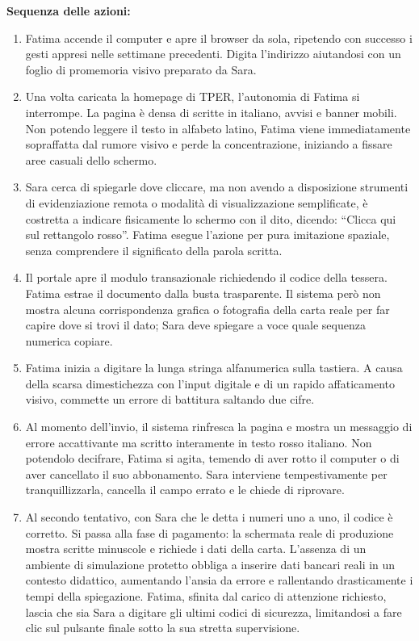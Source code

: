 \documentclass[11pt,a4paper]{article}
\begin{document}
\begin{center}
\begin{tcolorbox}[colback=backgroundColor,colframe=borderColor,arc=2mm]
{    \textbf{Sequenza delle azioni:}
    \begin{enumerate}
        \item Fatima accende il computer e apre il browser da sola, ripetendo con successo i gesti appresi nelle settimane precedenti. Digita l'indirizzo aiutandosi con un foglio di promemoria visivo preparato da Sara.
        \item Una volta caricata la homepage di TPER, l'autonomia di Fatima si interrompe. La pagina è densa di scritte in italiano, avvisi e banner mobili. Non potendo leggere il testo in alfabeto latino, Fatima viene immediatamente sopraffatta dal rumore visivo e perde la concentrazione, iniziando a fissare aree casuali dello schermo.
        \item Sara cerca di spiegarle dove cliccare, ma non avendo a disposizione strumenti di evidenziazione remota o modalità di visualizzazione semplificate, è costretta a indicare fisicamente lo schermo con il dito, dicendo: ``Clicca qui sul rettangolo rosso''. Fatima esegue l'azione per pura imitazione spaziale, senza comprendere il significato della parola scritta.
        \item Il portale apre il modulo transazionale richiedendo il codice della tessera. Fatima estrae il documento dalla busta trasparente. Il sistema però non mostra alcuna corrispondenza grafica o fotografia della carta reale per far capire dove si trovi il dato; Sara deve spiegare a voce quale sequenza numerica copiare.
        \item Fatima inizia a digitare la lunga stringa alfanumerica sulla tastiera. A causa della scarsa dimestichezza con l'input digitale e di un rapido affaticamento visivo, commette un errore di battitura saltando due cifre.
        \item Al momento dell'invio, il sistema rinfresca la pagina e mostra un messaggio di errore accattivante ma scritto interamente in testo rosso italiano. Non potendolo decifrare, Fatima si agita, temendo di aver rotto il computer o di aver cancellato il suo abbonamento. Sara interviene tempestivamente per tranquillizzarla, cancella il campo errato e le chiede di riprovare.
        \item Al secondo tentativo, con Sara che le detta i numeri uno a uno, il codice è corretto. Si passa alla fase di pagamento: la schermata reale di produzione mostra scritte minuscole e richiede i dati della carta. L'assenza di un ambiente di simulazione protetto obbliga a inserire dati bancari reali in un contesto didattico, aumentando l'ansia da errore e rallentando drasticamente i tempi della spiegazione. Fatima, sfinita dal carico di attenzione richiesto, lascia che sia Sara a digitare gli ultimi codici di sicurezza, limitandosi a fare clic sul pulsante finale sotto la sua stretta supervisione.
    \end{enumerate}

}
\end{tcolorbox}
\end{center}
\end{document}
